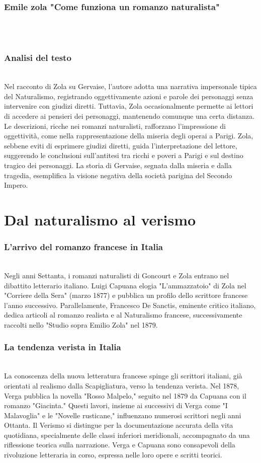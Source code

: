 \documentclass{report}
\begin{document}
\subsubsection{Emile zola "Come funziona un romanzo naturalista"}
\\
\\
\subsubsection{Analisi del testo}
\\
Nel racconto di Zola su Gervaise, l'autore adotta una narrativa impersonale tipica del Naturalismo, registrando oggettivamente azioni e parole dei personaggi senza intervenire con giudizi diretti. Tuttavia, Zola occasionalmente permette ai lettori di accedere ai pensieri dei personaggi, mantenendo comunque una certa distanza. Le descrizioni, ricche nei romanzi naturalisti, rafforzano l'impressione di oggettività, come nella rappresentazione della miseria degli operai a Parigi. Zola, sebbene eviti di esprimere giudizi diretti, guida l'interpretazione del lettore, suggerendo le conclusioni sull'antitesi tra ricchi e poveri a Parigi e sul destino tragico dei personaggi. La storia di Gervaise, segnata dalla miseria e dalla tragedia, esemplifica la visione negativa della società parigina del Secondo Impero.
\\
\section{Dal naturalismo al verismo}  
\subsubsection{L’arrivo del romanzo francese in Italia}
\\
Negli anni Settanta, i romanzi naturalisti di Goncourt e Zola entrano nel dibattito letterario italiano. Luigi Capuana elogia "L’ammazzatoio" di Zola nel "Corriere della Sera" (marzo 1877) e pubblica un profilo dello scrittore francese l'anno successivo. Parallelamente, Francesco De Sanctis, eminente critico italiano, dedica articoli al romanzo realista e al Naturalismo francese, successivamente raccolti nello "Studio sopra Emilio Zola" nel 1879.
\\
\subsubsection{La tendenza verista in Italia}
\\
La conoscenza della nuova letteratura francese spinge gli scrittori italiani, già orientati al realismo dalla Scapigliatura, verso la tendenza verista. Nel 1878, Verga pubblica la novella "Rosso Malpelo," seguito nel 1879 da Capuana con il romanzo "Giacinta." Questi lavori, insieme ai successivi di Verga come "I Malavoglia" e le "Novelle rusticane," influenzano numerosi scrittori negli anni Ottanta. Il Verismo si distingue per la documentazione accurata della vita quotidiana, specialmente delle classi inferiori meridionali, accompagnato da una riflessione teorica sulla narrazione. Verga e Capuana sono consapevoli della rivoluzione letteraria in corso, espressa nelle loro opere e scritti teorici.
\\
\end{document}
